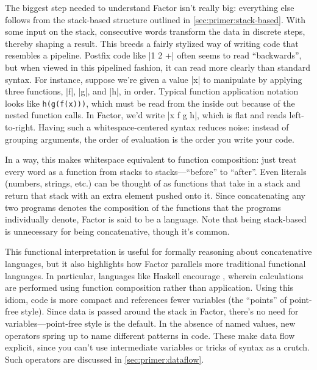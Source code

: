 The biggest step needed to understand Factor isn't really big: everything else
follows from the stack-based structure outlined in
\ref{sec:primer:stack-based}.  With some input on the stack, consecutive words
transform the data in discrete steps, thereby shaping a result.  This breeds a
fairly stylized way of writing code that resembles a pipeline.  Postfix code
like \factor|1 2 +| often seems to read ``backwards'', but when viewed in
this pipelined fashion, it can read more clearly than standard syntax.  For
instance, suppose we're given a value \factor|x| to manipulate by applying
three functions, \factor|f|, \factor|g|, and \factor|h|, in order.
Typical function application notation looks like \texttt{h(g(f(x)))}, which
must be read from the inside out because of the nested function calls.  In
Factor, we'd write \factor|x f g h|, which is flat and reads left-to-right.
Having such a whitespace-centered syntax reduces noise: instead of grouping
arguments, the order of evaluation is the order you write your code.

In a way, this makes whitespace equivalent to function composition: just treat
every word as a function from stacks to stacks---``before'' to ``after''.  Even
literals (numbers, strings, etc.) can be thought of as functions that take in a
stack and return that stack with an extra element pushed onto it.  Since
concatenating any two programs denotes the composition of the functions that
the programs individually denote, Factor is said to be a 
language.  Note that being stack-based is
unnecessary for being concatenative, though it's common.

This functional interpretation is useful for formally reasoning about
concatenative languages, but it also highlights how Factor
parallels more traditional functional languages.  In particular, languages like
Haskell encourage , wherein calculations are performed
using function composition rather than application.  Using this
idiom, code is more compact and references fewer variables (the ``points'' of
point-free style).  Since data is passed around the stack in Factor, there's no
need for variables---point-free style is the default.  In the absence of named
values, new operators spring up to name different patterns in code.  These make
data flow explicit, since you can't use intermediate variables or tricks of
syntax as a crutch.  Such operators are discussed in \ref{sec:primer:dataflow}.

